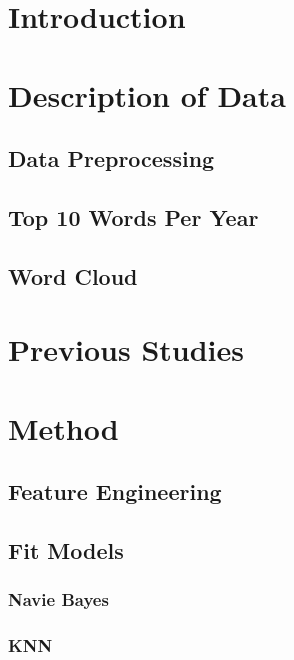 \documentclass[12pt]{article}
\begin{document}
\section{Introduction} \label{sec:Intro}



\section{Description of Data} \label{sec:Descript}

\subsection{Data Preprocessing}



\subsection{Top 10 Words Per Year}



\subsection{Word Cloud}



\section{Previous Studies}


\section{Method}

\subsection{Feature Engineering}


\subsection{Fit Models}
\subsubsection{Navie Bayes}

\subsubsection{KNN}

\end{document}
